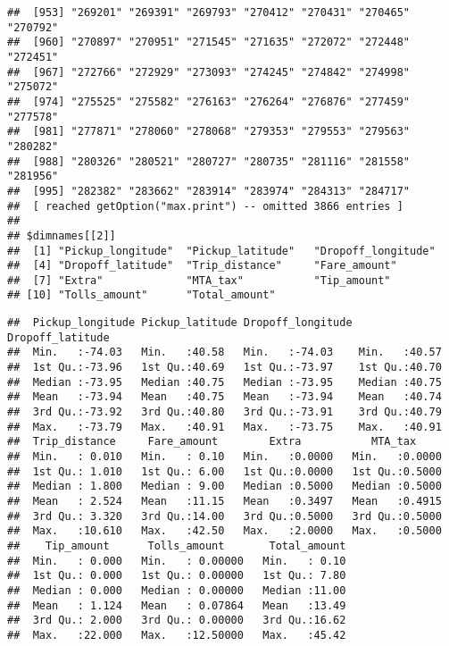 \documentclass[]{article}
\newenvironment{Shaded}{\begin{snugshade}}{\end{snugshade}}
\newcommand{\KeywordTok}[1]{\textcolor[rgb]{0.13,0.29,0.53}{\textbf{{#1}}}}
\newcommand{\NormalTok}[1]{{#1}}
\begin{document}
\begin{verbatim}
##  [953] "269201" "269391" "269793" "270412" "270431" "270465" "270792"
##  [960] "270897" "270951" "271545" "271635" "272072" "272448" "272451"
##  [967] "272766" "272929" "273093" "274245" "274842" "274998" "275072"
##  [974] "275525" "275582" "276163" "276264" "276876" "277459" "277578"
##  [981] "277871" "278060" "278068" "279353" "279553" "279563" "280282"
##  [988] "280326" "280521" "280727" "280735" "281116" "281558" "281956"
##  [995] "282382" "283662" "283914" "283974" "284313" "284717"
##  [ reached getOption("max.print") -- omitted 3866 entries ]
## 
## $dimnames[[2]]
##  [1] "Pickup_longitude"  "Pickup_latitude"   "Dropoff_longitude"
##  [4] "Dropoff_latitude"  "Trip_distance"     "Fare_amount"      
##  [7] "Extra"             "MTA_tax"           "Tip_amount"       
## [10] "Tolls_amount"      "Total_amount"
\end{verbatim}

\begin{Shaded}
\end{Shaded}

\begin{verbatim}
##  Pickup_longitude Pickup_latitude Dropoff_longitude Dropoff_latitude
##  Min.   :-74.03   Min.   :40.58   Min.   :-74.03    Min.   :40.57   
##  1st Qu.:-73.96   1st Qu.:40.69   1st Qu.:-73.97    1st Qu.:40.70   
##  Median :-73.95   Median :40.75   Median :-73.95    Median :40.75   
##  Mean   :-73.94   Mean   :40.75   Mean   :-73.94    Mean   :40.74   
##  3rd Qu.:-73.92   3rd Qu.:40.80   3rd Qu.:-73.91    3rd Qu.:40.79   
##  Max.   :-73.79   Max.   :40.91   Max.   :-73.75    Max.   :40.91   
##  Trip_distance     Fare_amount        Extra           MTA_tax      
##  Min.   : 0.010   Min.   : 0.10   Min.   :0.0000   Min.   :0.0000  
##  1st Qu.: 1.010   1st Qu.: 6.00   1st Qu.:0.0000   1st Qu.:0.5000  
##  Median : 1.800   Median : 9.00   Median :0.5000   Median :0.5000  
##  Mean   : 2.524   Mean   :11.15   Mean   :0.3497   Mean   :0.4915  
##  3rd Qu.: 3.320   3rd Qu.:14.00   3rd Qu.:0.5000   3rd Qu.:0.5000  
##  Max.   :10.610   Max.   :42.50   Max.   :2.0000   Max.   :0.5000  
##    Tip_amount      Tolls_amount       Total_amount  
##  Min.   : 0.000   Min.   : 0.00000   Min.   : 0.10  
##  1st Qu.: 0.000   1st Qu.: 0.00000   1st Qu.: 7.80  
##  Median : 0.000   Median : 0.00000   Median :11.00  
##  Mean   : 1.124   Mean   : 0.07864   Mean   :13.49  
##  3rd Qu.: 2.000   3rd Qu.: 0.00000   3rd Qu.:16.62  
##  Max.   :22.000   Max.   :12.50000   Max.   :45.42
\end{verbatim}
\end{document}
